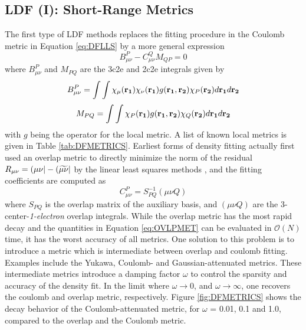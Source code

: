\subsection{LDF (I): Short-Range Metrics}
The first type of LDF methods replaces the fitting procedure in the Coulomb metric in Equation \ref{eq:DFLLS} by a more general expression
\begin{equation}
B_{\mu\nu}^{P} - C_{\mu\nu}^{Q} M_{QP} = 0
\end{equation}  
\noindent where $B_{\mu\nu}^{P}$ and $M_{PQ}$ are the 3c2e and 2c2e integrals given by
\begin{equation}
B_{\mu\nu}^P = \int\int \chi_{\mu}(\mathbf{r_{1}})\chi_{\nu}(\mathbf{r_{1}}) g(\mathbf{r_1},\mathbf{r_2}) \chi_{P}(\mathbf{r_{2}}) d\mathbf{r_1} d\mathbf{r_2}
\end{equation}
\begin{equation}
M_{PQ} = \int\int \chi_{P}(\mathbf{r_{1}}) g(\mathbf{r_1},\mathbf{r_2}) \chi_{Q}(\mathbf{r_{2}}) d\mathbf{r_1} d\mathbf{r_2}
\end{equation}
\noindent with $g$ being the operator for the local metric. A list of known local metrics is given in Table \ref{tab:DFMETRICS}. Earliest forms of density fitting actually first used an overlap metric to directly minimize the norm of the residual $R_{\mu\nu} = \left( \mu\nu \right\rvert - \left( \widetilde{\mu\nu} \right\rvert$ by the linear least squares methods \cite{Bae1973}, and the fitting coefficients are computed as
\begin{equation}
C^P_{\mu\nu} = S_{PQ}^{-1} (\mu\nu Q)
\label{eq:OVLPMET}
\end{equation}
\noindent where $S_{PQ}$ is the overlap matrix of the auxiliary basis, and $(\mu\nu Q)$ are the 3-center-\emph{1-electron} overlap integrals. While the overlap metric has the most rapid decay and the quantities in Equation \ref{eq:OVLPMET} can be evaluated in $\mathcal{O}(N)$ time, it has the worst accuracy of all metrics. One solution to this problem is to introduce a metric which is intermediate between overlap and coulomb fitting. Examples include the Yukawa, Coulomb- and Gaussian-attenuated metrics. These intermediate metrics introduce a damping factor $\omega$ to control the sparsity and accuracy of the density fit. In the limit where $\omega \rightarrow 0$, and $\omega \rightarrow \infty$, one recovers the coulomb and overlap metric, respectively. Figure \ref{fig:DFMETRICS} shows the decay behavior of the Coulomb-attenuated metric, for $\omega$ = 0.01, 0.1 and 1.0, compared to the overlap and the Coulomb metric. 

